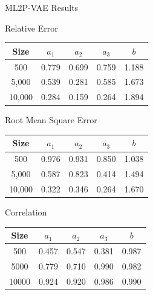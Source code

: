 \documentclass{beamer}
\theoremstyle{definition}
\begin{document}
\begin{frame}{ML2P-VAE Results}
\begin{center}
\scriptsize

Relative Error\\
\begin{tabular}{ccccc}
\hline
Size  & $a_1$ & $a_2$ & $a_3$ & $b$ \\
\hline
500   & 0.779 & 0.699 & 0.759 & 1.188 \\
5,000 & 0.539 & 0.281 & 0.585 & 1.673 \\
10,000  &0.284  & 0.159 & 0.264 & 1.894 \\
\hline
\end{tabular}

\vspace{.5cm}

Root Mean Square Error\\
\begin{tabular}{ccccc}
\hline
Size  & $a_1$ & $a_2$ & $a_3$ & $b$   \\
\hline
500   & 0.976 & 0.931 & 0.850 & 1.038 \\
5,000 & 0.587 & 0.823 & 0.414 & 1.494 \\
10,000  & 0.322 & 0.346 & 0.264 & 1.670 \\
\hline
\end{tabular}

\vspace{.5cm}

Correlation\\
\begin{tabular}{ccccc}
\hline
Size  & $a_1$ & $a_2$ & $a_3$ & $b$ \\
\hline
500   & 0.457 & 0.547 & 0.381 & 0.987 \\
5000  & 0.779 & 0.710 & 0.990 & 0.982 \\
10000   & 0.924 & 0.920 & 0.986 & 0.990 \\
\hline
\end{tabular}
\end{center}
\end{frame}
\end{document}
